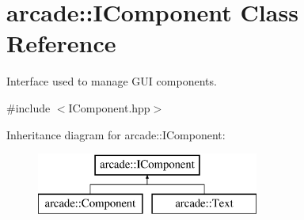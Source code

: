 \hypertarget{classarcade_1_1_i_component}{\section{arcade\-:\-:I\-Component Class Reference}
\label{classarcade_1_1_i_component}
}


Interface used to manage G\-U\-I components.  




{\ttfamily \#include $<$I\-Component.\-hpp$>$}

Inheritance diagram for arcade\-:\-:I\-Component\-:\begin{figure}[H]
\begin{center}
\leavevmode
\includegraphics[height=2.000000cm]{classarcade_1_1_i_component}
\end{center}
\end{figure}
